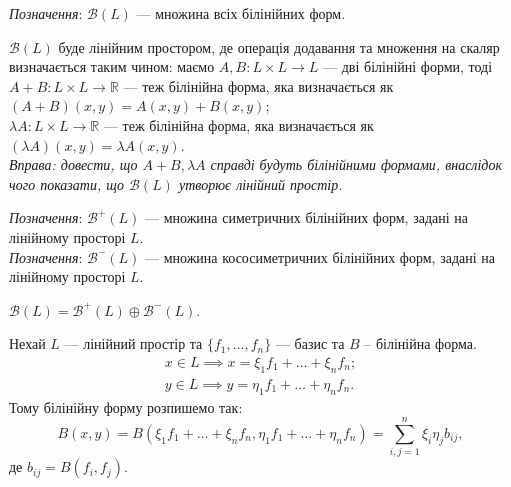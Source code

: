 \documentclass{math_library}
\begin{document}
\textit{Позначення}: $\mathcal{B}(L)$ --- множина всіх білінійних форм.

\begin{proposition}
$\mathcal{B}(L)$ буде лінійним простором, де операція додавання та множення на скаляр визначається таким чином: маємо $A,B \colon L \times L \to L$ --- дві білінійні форми, тоді\\
$A+B \colon L \times L \to \mathbb{R}$ --- теж білінійна форма, яка визначається як $(A+B)(x,y) = A(x,y) + B(x,y)$;\\
$\lambda A \colon L \times L \to \mathbb{R}$ --- теж білінійна форма, яка визначається як $(\lambda A)(x,y) = \lambda A(x,y)$.\\
\textit{Вправа: довести, що $A+B, \lambda A$ справді будуть білінійними формами, внаслідок чого показати, що $\mathcal{B}(L)$ утворює лінійний простір.}
\end{proposition}

\textit{Позначення}: $\mathcal{B}^+(L)$ --- множина симетричних білінійних форм, задані на лінійному просторі $L$.\\
\textit{Позначення}: $\mathcal{B}^-(L)$ --- множина кососиметричних білінійних форм, задані на лінійному просторі $L$.

\begin{corollary}
$\mathcal{B}(L) = \mathcal{B}^+(L)  \oplus  \mathcal{B}^-(L)$.
\end{corollary}

\noindent
Нехай $L$ --- лінійний простір та $\{f_1,\dots,f_n\}$ --- базис та $B$ -- білінійна форма.
\begin{align*}
x \in L \implies x = \xi_1 f_1 + \dots + \xi_n f_n; \\
y \in L \implies y = \eta_1 f_1 + \dots + \eta_n f_n.
\end{align*}
Тому білінійну форму розпишемо так:
\[
B(x,y) = B(\xi_1 f_1 + \dots + \xi_n f_n, \eta_1 f_1 + \dots + \eta_n f_n) = \displaystyle\sum_{i,j=1}^n \xi_i \eta_j b_{ij},
\]
де $b_{ij} = B(f_i,f_j)$.
\end{document}

